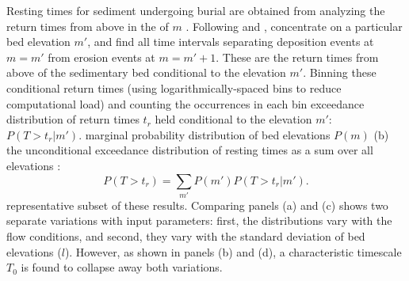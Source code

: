 Resting times for sediment undergoing burial are obtained from analyzing the return times from above in the \DIFdelbegin {}\DIFdelend \DIFaddbegin {}\DIFaddend of $m$ \DIFdelbegin {}\DIFdelend \DIFaddbegin {}\DIFaddend .
Following \citet{Voepel2013} and \citet{Martin2014}, \DIFdelbegin {}\DIFdelend \DIFaddbegin {}\DIFaddend concentrate on a particular bed elevation $m'$, and find all time intervals separating deposition events at $m=m'$ from erosion events at $m=m'+1$.
These are the return times from above of the sedimentary bed conditional to the elevation $m'$.
Binning these conditional return times (using logarithmically-spaced bins to reduce computational load) and counting the occurrences in each bin \DIFdelbegin {}\DIFdelend \DIFaddbegin {}\DIFaddend exceedance distribution of return times $t_r$ held conditional to the elevation $m'$: $P(T>t_r|m')$.
\DIFdelbegin {}\DIFdelend \DIFaddbegin {}\DIFaddend marginal probability distribution of bed elevations $P(m)$ \DIFdelbegin {}\DIFdelend \DIFaddbegin {}\DIFaddend (b) \DIFdelbegin {}\DIFdelend \DIFaddbegin {}\DIFaddend the unconditional exceedance distribution of resting times as a sum over all elevations \citep{Yang1971, Nakagawa1980, Voepel2013, Martin2014}: 
\begin{equation} P(T>t_r) = \sum_{m'} P(m') P(T>t_r|m') .\end{equation}
\DIFdelbegin {}\DIFdelend \DIFaddbegin {}\DIFaddend representative subset of these results\DIFdelbegin {}\DIFdelend .
Comparing panels \DIFdelbegin \DIFdel{\ref{fig:cdfs}}\DIFdelend (a) and \DIFdelbegin \DIFdel{\ref{fig:cdfs}}\DIFdelend (c) \DIFaddbegin {}\DIFaddend shows two separate variations with input parameters: first, the distributions vary with the flow conditions, and second, they vary with the standard deviation of bed elevations ($l$).
However, as shown in panels \DIFdelbegin \DIFdel{\ref{fig:cdfs}}\DIFdelend (b) and \DIFdelbegin \DIFdel{\ref{fig:cdfs}}\DIFdelend (d), a characteristic timescale $T_0$ is found to collapse away both variations.
